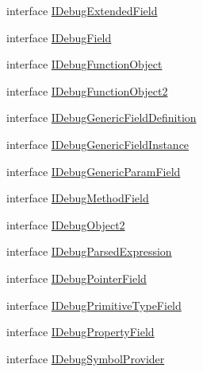 \begin{DoxyCompactItemize}
\item 
interface \hyperlink{interface_microsoft_1_1_visual_studio_1_1_debugger_1_1_interop_e_e_1_1_i_debug_extended_field}{I\+Debug\+Extended\+Field}
\item 
interface \hyperlink{interface_microsoft_1_1_visual_studio_1_1_debugger_1_1_interop_e_e_1_1_i_debug_field}{I\+Debug\+Field}
\item 
interface \hyperlink{interface_microsoft_1_1_visual_studio_1_1_debugger_1_1_interop_e_e_1_1_i_debug_function_object}{I\+Debug\+Function\+Object}
\item 
interface \hyperlink{interface_microsoft_1_1_visual_studio_1_1_debugger_1_1_interop_e_e_1_1_i_debug_function_object2}{I\+Debug\+Function\+Object2}
\item 
interface \hyperlink{interface_microsoft_1_1_visual_studio_1_1_debugger_1_1_interop_e_e_1_1_i_debug_generic_field_definition}{I\+Debug\+Generic\+Field\+Definition}
\item 
interface \hyperlink{interface_microsoft_1_1_visual_studio_1_1_debugger_1_1_interop_e_e_1_1_i_debug_generic_field_instance}{I\+Debug\+Generic\+Field\+Instance}
\item 
interface \hyperlink{interface_microsoft_1_1_visual_studio_1_1_debugger_1_1_interop_e_e_1_1_i_debug_generic_param_field}{I\+Debug\+Generic\+Param\+Field}
\item 
interface \hyperlink{interface_microsoft_1_1_visual_studio_1_1_debugger_1_1_interop_e_e_1_1_i_debug_method_field}{I\+Debug\+Method\+Field}
\item 
interface \hyperlink{interface_microsoft_1_1_visual_studio_1_1_debugger_1_1_interop_e_e_1_1_i_debug_object2}{I\+Debug\+Object2}
\item 
interface \hyperlink{interface_microsoft_1_1_visual_studio_1_1_debugger_1_1_interop_e_e_1_1_i_debug_parsed_expression}{I\+Debug\+Parsed\+Expression}
\item 
interface \hyperlink{interface_microsoft_1_1_visual_studio_1_1_debugger_1_1_interop_e_e_1_1_i_debug_pointer_field}{I\+Debug\+Pointer\+Field}
\item 
interface \hyperlink{interface_microsoft_1_1_visual_studio_1_1_debugger_1_1_interop_e_e_1_1_i_debug_primitive_type_field}{I\+Debug\+Primitive\+Type\+Field}
\item 
interface \hyperlink{interface_microsoft_1_1_visual_studio_1_1_debugger_1_1_interop_e_e_1_1_i_debug_property_field}{I\+Debug\+Property\+Field}
\item 
interface \hyperlink{interface_microsoft_1_1_visual_studio_1_1_debugger_1_1_interop_e_e_1_1_i_debug_symbol_provider}{I\+Debug\+Symbol\+Provider}

\end{DoxyCompactItemize}
